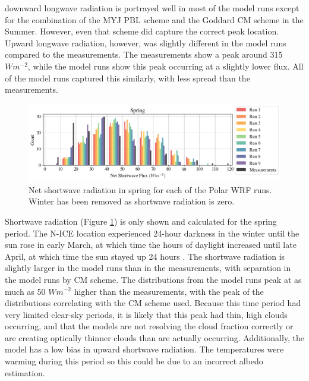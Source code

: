 downward longwave radiation is portrayed well in most of the model runs except for the combination of the MYJ PBL scheme and the Goddard CM scheme in the Summer. However, even that scheme did capture the correct peak location. Upward longwave radiation, however, was slightly different in the model runs compared to the measurements. The measurements show a peak around 315 $Wm^{-2}$, while the model runs show this peak occurring at a slightly lower flux. All of the model runs captured this similarly, with less spread than the measurements.

\begin{figure}[H]
    \centering
    \includegraphics[width=1\linewidth]{figures/chapter3/WRF_NetSW_Histo.png}
    \caption[Polar WRF simulation net shortwave radiation histograms]{Net shortwave radiation in spring for each of the Polar WRF runs. Winter has been removed as shortwave radiation is zero.}
    \label{fig:wrf_netsw}
\end{figure}

Shortwave radiation (Figure \ref{fig:wrf_netsw}) is only shown and calculated for the spring period. The N-ICE location experienced 24-hour darkness in the winter until the sun rose in early March, at which time the hours of daylight increased until late April, at which time the sun stayed up 24 hours \citep{walden:2017}. The shortwave radiation is slightly larger in the model runs than in the measurements, with separation in the model runs by CM scheme. The distributions from the model runs peak at as much as 50 $Wm^{-2}$ higher than the measurements, with the peak of the distributions correlating with the CM scheme used. Because this time period had very limited clear-sky periods, it is likely that this peak had thin, high clouds occurring, and that the models are not resolving the cloud fraction correctly or are creating optically thinner clouds than are actually occurring. Additionally, the model has a low bias in upward shortwave radiation. The temperatures were warming during this period so this could be due to an incorrect albedo estimation. 

